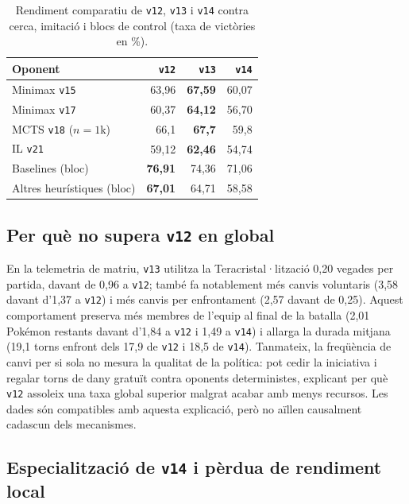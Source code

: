 \begin{table}[htbp]
\centering
\small
\caption{Rendiment comparatiu de \texttt{v12}, \texttt{v13} i \texttt{v14} contra cerca, imitació i blocs de control (taxa de victòries en \%).}
\label{tab:v13_vs_search}
\begin{tabular}{lrrr}
\toprule
Oponent & \texttt{v12} & \texttt{v13} & \texttt{v14} \\
\midrule
Minimax \texttt{v15} & 63,96 & \textbf{67,59} & 60,07 \\
Minimax \texttt{v17} & 60,37 & \textbf{64,12} & 56,70 \\
MCTS \texttt{v18} ($n=1$k) & 66,1 & \textbf{67,7} & 59,8 \\
IL \texttt{v21} & 59,12 & \textbf{62,46} & 54,74 \\
Baselines (bloc) & \textbf{76,91} & 74,36 & 71,06 \\
Altres heurístiques (bloc) & \textbf{67,01} & 64,71 & 58,58 \\
\bottomrule
\end{tabular}
\end{table}

\subsection{Per què no supera \texttt{v12} en global}

En la telemetria de matriu, \texttt{v13} utilitza la Teracristal·lització 0,20 vegades per partida, davant de 0,96 a \texttt{v12}; també fa notablement més canvis voluntaris (3,58 davant d'1,37 a \texttt{v12}) i més canvis per enfrontament (2,57 davant de 0,25). Aquest comportament preserva més membres de l'equip al final de la batalla (2,01 Pokémon restants davant d'1,84 a \texttt{v12} i 1,49 a \texttt{v14}) i allarga la durada mitjana (19,1 torns enfront dels 17,9 de \texttt{v12} i 18,5 de \texttt{v14}). Tanmateix, la freqüència de canvi per si sola no mesura la qualitat de la política: pot cedir la iniciativa i regalar torns de dany gratuït contra oponents deterministes, explicant per què \texttt{v12} assoleix una taxa global superior malgrat acabar amb menys recursos. Les dades són compatibles amb aquesta explicació, però no aïllen causalment cadascun dels mecanismes.

\subsection{Especialització de \texttt{v14} i pèrdua de rendiment local}

